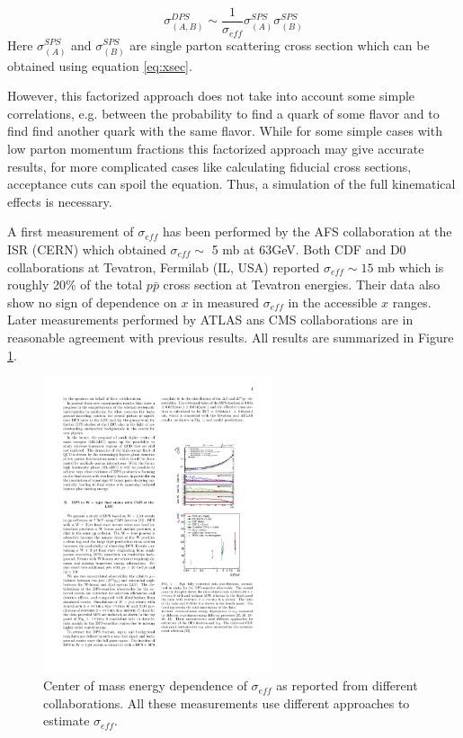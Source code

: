 \begin{equation}
\sigma_{(A,B)}^{DPS} \sim \frac{1}{\sigma_{eff}} \sigma^{SPS}_{(A)} \sigma^{SPS}_{(B)}
\end{equation}
Here $\sigma^{SPS}_{(A)}$ and $\sigma^{SPS}_{(B)}$ are single parton scattering cross section which can be obtained using equation \ref{eq:xsec}.
\par However, this factorized approach does not take into account some simple correlations, e.g. between the probability to find a quark of some flavor and to find find another quark with the same flavor. While for some simple cases with low parton momentum fractions this factorized approach may give accurate results, for more complicated cases like calculating fiducial cross sections, acceptance cuts can spoil the equation. Thus, a simulation of the full kinematical effects is necessary.
\par A first measurement of $\sigma_{eff}$ has been performed by the AFS collaboration at the ISR (CERN) which obtained $\sigma_{eff} \sim$ 5 mb at 63GeV. Both CDF and D0 collaborations at Tevatron, Fermilab (IL, USA) reported $\sigma_{eff} \sim 15$ mb which is roughly 20$\%$ of the total $p\bar{p}$ cross section at Tevatron energies. Their data also show no sign of dependence on $x$ in measured $\sigma_{eff}$  in the accessible $x$ ranges. Later measurements performed by ATLAS ans CMS collaborations are in reasonable agreement with previous results. All results are summarized in Figure \ref{fig:DPS_res}.
\begin{figure}[htbp]
	\centering
		\includegraphics[width=0.6\textwidth]{Figures/DPS_res.pdf}
	\caption[Results of $\sigma_{eff}$ measurements]{Center of mass energy dependence of $\sigma_{eff}$ as reported from different collaborations. All these measurements use different approaches to estimate $\sigma_{eff}$. \cite{Bansal:2014paa}}
	\label{fig:DPS_res}
\end{figure}

